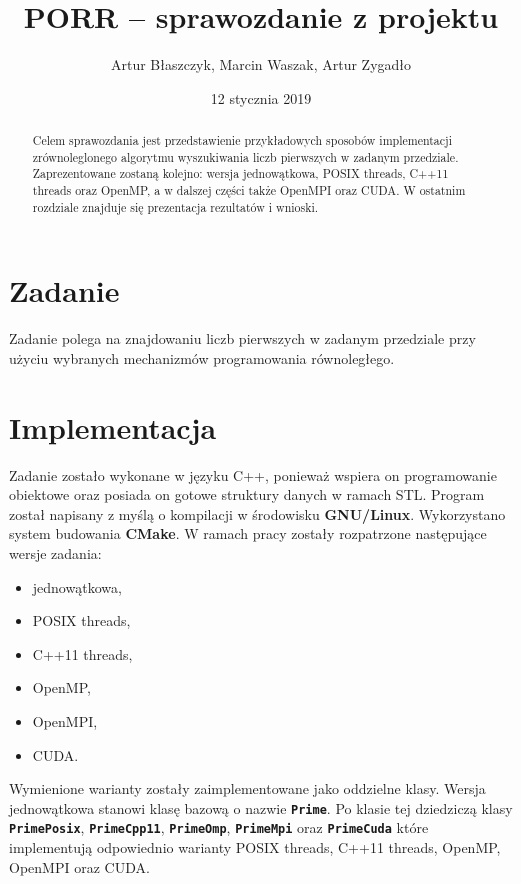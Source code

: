 \documentclass[12pt, twoside, hidelinks, a4paper]{article}
\begin{document}

\author{Artur Błaszczyk, Marcin Waszak, Artur Zygadło}
\title{PORR -- sprawozdanie z projektu}
\date{12 stycznia 2019}


\maketitle

\begin{abstract}
Celem sprawozdania jest przedstawienie przykładowych sposobów implementacji zrównoleglonego algorytmu wyszukiwania liczb pierwszych w zadanym przedziale. Zaprezentowane zostaną kolejno: wersja jednowątkowa, POSIX threads, C++11 threads oraz OpenMP, a w dalszej części także OpenMPI oraz CUDA. W ostatnim rozdziale znajduje się prezentacja rezultatów i wnioski. 
\end{abstract}

\section{Zadanie}
Zadanie polega na znajdowaniu liczb pierwszych w zadanym przedziale przy użyciu wybranych mechanizmów programowania równoległego.

\section{Implementacja}
Zadanie zostało wykonane w języku C++, ponieważ wspiera on programowanie obiektowe oraz posiada on gotowe struktury danych w ramach STL. Program został napisany z myślą o kompilacji w środowisku \textbf{GNU/Linux}. Wykorzystano system budowania \textbf{CMake}. W ramach pracy zostały rozpatrzone następujące wersje zadania:

\begin{multicols}{2}
\begin{itemize}
\item jednowątkowa,
\item POSIX threads,
\item C++11 threads,
\item OpenMP,
\item OpenMPI,
\item CUDA.
\end{itemize}
\end{multicols}

Wymienione warianty zostały zaimplementowane jako oddzielne klasy. Wersja jednowątkowa stanowi klasę bazową o nazwie \textbf{\texttt{Prime}}. Po klasie tej dziedziczą klasy \textbf{\texttt{PrimePosix}}, \textbf{\texttt{PrimeCpp11}}, \textbf{\texttt{PrimeOmp}}, \textbf{\texttt{PrimeMpi}} oraz \textbf{\texttt{PrimeCuda}} które implementują odpowiednio warianty POSIX threads, C++11 threads, OpenMP, OpenMPI oraz CUDA.
\end{document}
